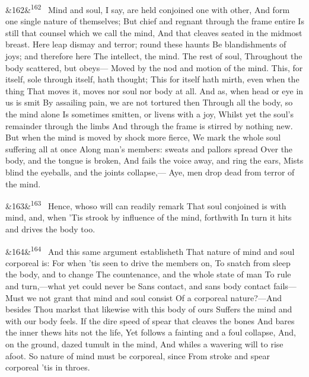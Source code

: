 \documentclass[12pt]{article}
\newcommand{\para}[1][]{\par\noindent\ifx&#1&\else\textsuperscript{\footnotesize #1}~\fi}
\begin{document}
\para[162] Mind and soul, I say, are held conjoined one with other, And form one single nature of themselves; But chief and regnant through the frame entire Is still that counsel which we call the mind, And that cleaves seated in the midmost breast. Here leap dismay and terror; round these haunts Be blandishments of joys; and therefore here The intellect, the mind. The rest of soul, Throughout the body scattered, but obeys--- Moved by the nod and motion of the mind. This, for itself, sole through itself, hath thought; This for itself hath mirth, even when the thing That moves it, moves nor soul nor body at all. And as, when head or eye in us is smit By assailing pain, we are not tortured then Through all the body, so the mind alone Is sometimes smitten, or livens with a joy, Whilst yet the soul's remainder through the limbs And through the frame is stirred by nothing new. But when the mind is moved by shock more fierce, We mark the whole soul suffering all at once Along man's members: sweats and pallors spread Over the body, and the tongue is broken, And fails the voice away, and ring the ears, Mists blind the eyeballs, and the joints collapse,--- Aye, men drop dead from terror of the mind.

\para[163] Hence, whoso will can readily remark That soul conjoined is with mind, and, when 'Tis strook by influence of the mind, forthwith In turn it hits and drives the body too.

\para[164] And this same argument establisheth That nature of mind and soul corporeal is: For when 'tis seen to drive the members on, To snatch from sleep the body, and to change The countenance, and the whole state of man To rule and turn,---what yet could never be Sans contact, and sans body contact fails--- Must we not grant that mind and soul consist Of a corporeal nature?---And besides Thou markst that likewise with this body of ours Suffers the mind and with our body feels. If the dire speed of spear that cleaves the bones And bares the inner thews hits not the life, Yet follows a fainting and a foul collapse, And, on the ground, dazed tumult in the mind, And whiles a wavering will to rise afoot. So nature of mind must be corporeal, since From stroke and spear corporeal 'tis in throes.
\end{document}
